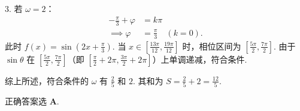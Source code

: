 {  3. 若 $\omega = 2$：
     $$
     \begin{aligned}
     -\frac{\pi}{3} + \varphi &= k\pi \\
     \implies \varphi &= \frac{\pi}{3} \quad (k=0).
     \end{aligned}
     $$
     此时 $f(x) = \sin\left(2x + \frac{\pi}{3}\right)$.
     当 $x \in \left[\frac{13\pi}{12}, \frac{19\pi}{12}\right]$ 时，相位区间为 $\left[\frac{5\pi}{2}, \frac{7\pi}{2}\right]$.
     由于 $\sin\theta$ 在 $\left[\frac{5\pi}{2}, \frac{7\pi}{2}\right]$（即 $\left[\frac{\pi}{2}+2\pi, \frac{3\pi}{2}+2\pi\right]$）上单调递减，符合条件.
  
  综上所述，符合条件的 $\omega$ 有 $\frac{2}{5}$ 和 $2$.
  其和为 $S = \frac{2}{5} + 2 = \frac{12}{5}$.
  
  正确答案选 \textbf{A}.
}

\newcommand{\qTrigOmegaSevenDiagnosis}{
  \errortag{候选值回代验证遗漏}
  学生极易在求出 $\omega = \frac{2}{5}, \frac{6}{5}, 2$ 之后，直接把这三个值相加得到 $\frac{18}{5}$（即选 D）. 他们容易忽视“单调递减”不仅限制了区间长度，还硬性规定了在这个区间上的运动方向.
}

\newcommand{\qTrigOmegaSevenTeachingNotes}{
  \teachblock{距离公式法}{
    两个特殊位置（轴与轴、中心与中心、轴与中心）的距离公式是快速求出离散 $\omega$ 的利器：
    - 对称轴与相邻对称轴距离为 $\frac{T}{2}$；
    - 对称中心与相邻对称中心距离为 $\frac{T}{2}$；
    - 对称轴与相邻对称中心距离为 $\frac{T}{4}$.
    利用这一几何直观可以极大地简化关于相位的代数方程联立. 但必须强调，这只是“对称位置”成立的必要条件，最终必须做单调性方向的回代验证.
  }
}


\newcommand{\qTrigOmegaEightStem}{
  已知函数 $f(x)=\sin(\omega x+\varphi)$（其中 $\omega>0$，$\lvert\varphi\rvert\le\frac{\pi}{2}$），且满足 $\left(-\frac{\pi}{18},0\right)$ 为 $f(x)$ 图像的一个对称中心，直线 $x=\frac{7\pi}{9}$ 为 $f(x)$ 图像的一条对称轴. 若 $f(x)$ 在 $\left[\frac{7\pi}{9},\frac{10\pi}{9}\right]$ 上单调，则符合条件的 $\omega$ 的值之和为\blank{2cm}.
}

\newcommand{\qTrigOmegaEightAnswer}{$\frac{27}{5}$}

